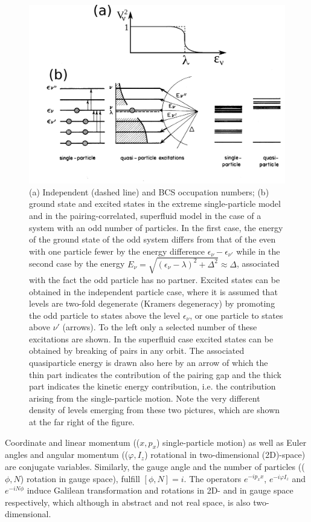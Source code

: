 \begin{figure}
	\centerline {
		\includegraphics*[width=15cm, angle=0.]{introduccion/figs/fig0_4_4_v2}
	}
	\caption{(a) Independent (dashed line) and BCS occupation numbers; (b) ground state and excited states in the extreme single-particle model and in the pairing-correlated, superfluid model in the case of a system with an odd number of particles. In the first case, the energy of the ground state of the odd system differs from that of the even with one particle fewer by the energy difference $\epsilon_\nu-\epsilon_{\nu'}$ while in the second case by the energy $E_\nu=\sqrt{(\epsilon_\nu-\lambda)^2+\Delta^2}\approx\Delta$, associated with the fact the odd particle has no partner. Excited states can be obtained in the independent particle case, where it is assumed that levels are two-fold degenerate (Kramers degeneracy) by promoting the odd particle to states above the level $\epsilon_\nu$, or one particle to  states above  $\nu'$ (arrows). To the left only a selected number of these excitations are shown. In the superfluid case excited states can be obtained by breaking of pairs in any orbit. The associated quasiparticle energy is drawn also here by an arrow of which the thin part indicates the contribution of the pairing gap and the thick part indicates the kinetic energy contribution, i.e. the contribution arising from the single-particle motion. Note the very different density of levels emerging from these two pictures, which are shown at the far right of the figure.}
	\label{fig0.4.3}
\end{figure}

Coordinate and linear momentum (($x,p_x$) single-particle motion) as well as Euler angles and angular momentum (($\varphi,I_z$) rotational in two-dimensional (2D)-space) are conjugate variables. Similarly, the gauge angle and the number of particles (($\phi,N$) rotation in gauge space), fulfill $[\phi,N]=i$. The operators $e^{-ip_xx}$, $e^{-i\varphi I_z}$ and $e^{-iN\phi}$ induce Galilean transformation and rotations in 2D- and in gauge space respectively, which although in abstract and not real space, is also two-dimensional.


